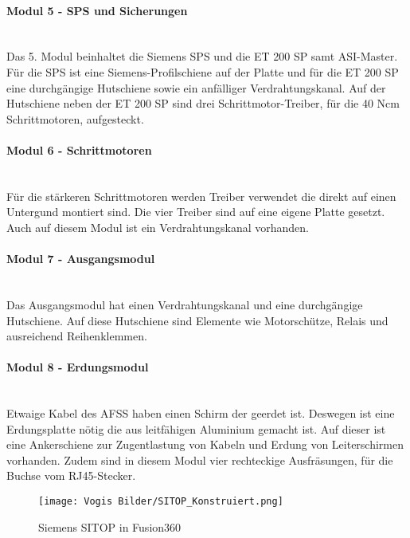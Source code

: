     \paragraph{Modul 5 - SPS und Sicherungen}\mbox{}\\
    Das 5. Modul beinhaltet die Siemens SPS und die ET 200 SP samt ASI-Master. Für die SPS ist eine Siemens-Profilschiene auf der Platte und für die ET 200 SP eine durchgängige Hutschiene sowie ein anfälliger Verdrahtungskanal. Auf der Hutschiene neben der ET 200 SP sind drei Schrittmotor-Treiber, für die 40 Ncm Schrittmotoren, aufgesteckt.
    \paragraph{Modul 6 - Schrittmotoren}\mbox{}\\
    Für die stärkeren Schrittmotoren werden Treiber verwendet die direkt auf einen Untergund montiert sind. Die vier Treiber sind auf eine eigene Platte gesetzt. Auch auf diesem Modul ist ein Verdrahtungskanal vorhanden.
    \paragraph{Modul 7 - Ausgangsmodul}\mbox{}\\
    Das Ausgangsmodul hat einen Verdrahtungskanal und eine durchgängige Hutschiene. Auf diese Hutschiene sind Elemente wie Motorschütze, Relais und ausreichend Reihenklemmen.
    \paragraph{Modul 8 - Erdungsmodul}\mbox{}\\
    Etwaige Kabel des AFSS haben einen Schirm der geerdet ist. Deswegen ist eine Erdungsplatte nötig die aus leitfähigen Aluminium gemacht ist. Auf dieser ist eine Ankerschiene zur Zugentlastung von Kabeln und Erdung von Leiterschirmen vorhanden. Zudem sind in diesem Modul vier rechteckige Ausfräsungen, für die Buchse vom RJ45-Stecker.
    \begin{figure}[h]
        \centering
        \texttt{[image: Vogis Bilder/SITOP\_Konstruiert.png]}
        \caption{Siemens SITOP in Fusion360}
        \label{fig:SITOP_Konstrueiert}
    \end{figure}
